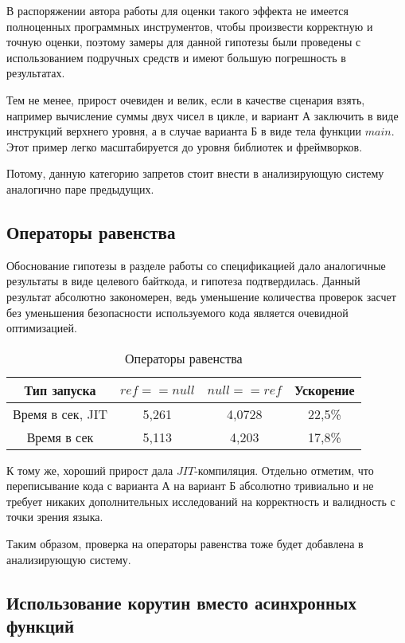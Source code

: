 \documentclass{mipt-thesis-bs}
\begin{document}
В распоряжении автора работы для оценки такого эффекта не имеется полноценных
программных инструментов, чтобы произвести корректную и точную оценки,
поэтому замеры для данной гипотезы были проведены с использованием подручных средств
и имеют большую погрешность в результатах.

Тем не менее, прирост очевиден и велик, если в качестве сценария взять, например
вычисление суммы двух чисел в цикле, и вариант А заключить в виде инструкций верхнего
уровня, а в случае варианта Б в виде тела функции $main$. Этот пример легко
масштабируется до уровня библиотек и фреймворков.

Потому, данную категорию запретов стоит внести в анализирующую систему аналогично
паре предыдущих.


\subsection{Операторы равенства}

Обоснование гипотезы в разделе работы со спецификацией дало аналогичные
результаты в виде целевого байткода, и гипотеза подтвердилась. Данный результат
абсолютно закономерен, ведь уменьшение количества проверок засчет без уменьшения
безопасности используемого кода является очевидной оптимизацией.

\begin{table}[h]
    \centering
    \begin{tabular}{|c|c|c|c|}
      \hline
      Тип запуска & $ref == null$ & $null == ref$ & Ускорение \\
      \hline
      Время в сек, JIT & 5,261 & 4,0728 & 22,5\% \\
      \hline
      Время в сек & 5,113 & 4,203 & 17,8\% \\
      \hline
    \end{tabular}
    \caption{Операторы равенства}
  \end{table}

К тому же, хороший прирост дала $JIT$-компиляция. Отдельно отметим, что переписывание
кода с варианта А на вариант Б абсолютно тривиально и не требует никаких дополнительных
исследований на корректность и валидность с точки зрения языка.

Таким образом, проверка
на операторы равенства тоже будет добавлена в анализирующую систему.

\subsection{Использование корутин вместо асинхронных функций}
\end{document}
